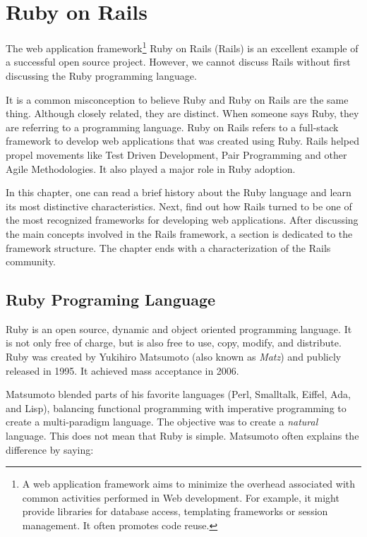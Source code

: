 \thispagestyle{empty}
\chapter{Ruby on Rails}\label{chap:ruby_on_rails}

The \textsf{web application framework}\footnote{
  A web application framework aims to minimize the overhead associated with common activities performed in Web development. 
  For example, it might provide libraries for database access, templating frameworks or session management. 
  It often promotes code reuse.
} Ruby on Rails (Rails) is an excellent example of a successful open source project.
However, we cannot discuss Rails without first discussing the Ruby programming language.

It is a common misconception to believe Ruby and Ruby on Rails are the same thing. 
Although closely related, they are distinct.
When someone says Ruby, they are referring to a programming language.
Ruby on Rails refers to a full-stack framework to develop web applications that was created using Ruby.
Rails helped propel movements like 
Test Driven Development, Pair Programming and other Agile Methodologies. 
It also played a major role in Ruby adoption. 

In this chapter, one can read a brief history about the Ruby language
and learn its most distinctive characteristics.
Next, find out how Rails turned to be one of the 
most recognized frameworks for developing web applications.
After discussing the main concepts involved in the Rails framework, 
a section is dedicated to the framework structure. 
The chapter ends with a characterization of the Rails community. 



\section{Ruby Programing Language} 
Ruby is an open source, dynamic and object oriented programming language.
It is not only free of charge, but is also free to use, copy, modify, and distribute.
Ruby was created by Yukihiro Matsumoto (also known as \emph{Matz}) and publicly released in 1995. 
It achieved mass acceptance in 2006.

Matsumoto blended parts of his favorite languages (Perl, Smalltalk, Eiffel, Ada, and Lisp), 
balancing functional programming with imperative programming 
to create a multi-paradigm language. 
The objective was to create a \emph{natural} language. 
This does not mean that Ruby is simple. Matsumoto often explains the difference by saying:

